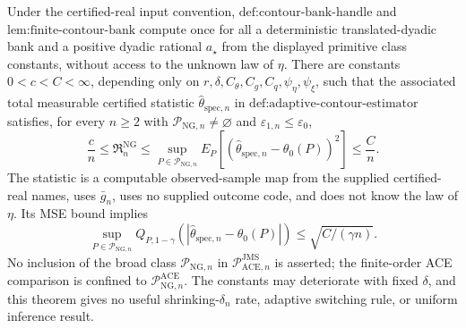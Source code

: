 Under the certified-real input convention, \(\text{def:contour-bank-handle}\) and \(\text{lem:finite-contour-bank}\) compute once for all a deterministic translated-dyadic bank and a positive dyadic rational \(a_{\star}\) from the displayed primitive class constants, without access to the unknown law of \(\eta\). There are constants \(0<c<C<\infty\), depending only on \(r,\delta,C_{\theta},C_g,C_q,\psi_{\eta},\psi_{\xi}\), such that the associated total measurable certified statistic \(\widehat\theta_{\mathrm{spec},n}\) in \(\text{def:adaptive-contour-estimator}\) satisfies, for every \(n\ge2\) with \(\mathcal P_{\mathrm{NG},n}\neq\varnothing\) and \(\varepsilon_{1,n}\le\varepsilon_0\),
\[
 \frac cn\le\mathfrak R_n^{\mathrm{NG}}
 \le\sup_{P\in\mathcal P_{\mathrm{NG},n}}
 E_P[(\widehat\theta_{\mathrm{spec},n}-\theta_0(P))^2]
 \le\frac Cn.
\]
The statistic is a computable observed-sample map from the supplied certified-real names, uses \(\bar g_n\), uses no supplied outcome code, and does not know the law of \(\eta\). Its MSE bound implies
\[
 \sup_{P\in\mathcal P_{\mathrm{NG},n}}
 Q_{P,1-\gamma}(|\widehat\theta_{\mathrm{spec},n}-\theta_0(P)|)
 \le\sqrt{C/(\gamma n)}.
\]
No inclusion of the broad class \(\mathcal P_{\mathrm{NG},n}\) in \(\mathcal P_{\mathrm{ACE},n}^{\mathrm{JMS}}\) is asserted; the finite-order ACE comparison is confined to \(\mathcal P_{\mathrm{NG},n}^{\mathrm{ACE}}\). The constants may deteriorate with fixed \(\delta\), and this theorem gives no useful shrinking-\(\delta_n\) rate, adaptive switching rule, or uniform inference result.